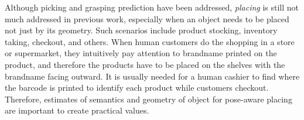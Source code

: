 
Although picking and grasping prediction have been addressed, \emph{placing} is still not much addressed in previous work, especially when an object needs to be placed not just by its geometry. Such scenarios include product stocking, inventory taking, checkout, and others. When human customers do the shopping in a store or supermarket, they intuitively pay attention to brandname printed on the product, and therefore the products have to be placed on the shelves with the brandname facing outward. It is usually needed for a human cashier to find where the barcode is printed to identify each product while customers checkout. Therefore, estimates of semantics and geometry of object for pose-aware placing are important to create practical values.

